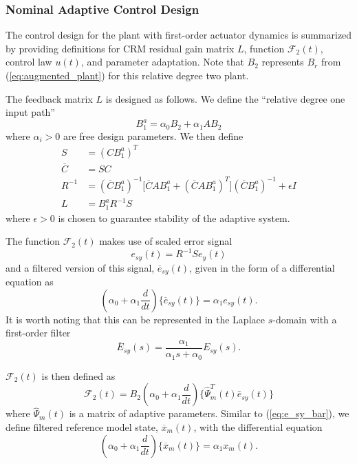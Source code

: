 \documentclass[english]{ifacconf}
\begin{document}
\subsubsection{Nominal Adaptive Control Design}
The control design for the plant with first-order actuator dynamics is summarized by providing definitions for CRM residual gain matrix $L$, function $\mathcal{F}_2(t)$, control law $u(t)$, and parameter adaptation. Note that $B_2$ represents $B_r$ from (\ref{eq:augmented_plant}) for this relative degree two plant. 

The feedback matrix $L$ is designed as follows. We define the ``relative degree one input path''
\begin{equation}
B_1^a = \alpha_0 B_2 + \alpha_1 A B_2 \label{eq:rd2-b1a}
\end{equation}
where $\alpha_i > 0$ are free design parameters. We then define
\begin{align}
S &= (C B_1^a)^T \label{eq:S}\\	\overline{C} & = S C\\ R^{-1} &= (\overline{C} B_1^a)^{-1} \big[ \overline{C} A B_1^a + (\overline{C} A B_1^a)^T\big] (\overline{C} B_1^a)^{-1} + \epsilon I \\ L & = B_1^a R^{-1} S \label{eq:L}
\end{align}
where $\epsilon > 0$ \cite[Eq. 30]{qu2015adaptive} is chosen to guarantee stability of the adaptive system. 

The function $\mathcal{F}_2(t)$ makes use of scaled error signal
\begin{equation}
	e_{sy}(t) = R^{-1} S e_y(t) \label{eq:esy}
\end{equation}
and a filtered version of this signal, $\overline{e}_{sy}(t)$, given in the form of a differential equation as
\begin{equation}
(\alpha_0 + \alpha_1 \frac{d}{dt}) \big\{ \overline{e}_{sy}(t) \big\} = \alpha_1 e_{sy}(t). \label{eq:e_sy_bar}
\end{equation}
It is worth noting that this can be represented in the Laplace $s$-domain with a first-order filter
\begin{equation*}
	\overline{E}_{sy}(s) = \frac{\alpha_1}{\alpha_1 s + \alpha_0} E_{sy}(s).
\end{equation*}

$\mathcal{F}_2(t)$ is then defined as
\begin{equation}
\mathcal{F}_2(t) = B_2 (\alpha_0 + \alpha_1 \frac{d}{dt})\big\{ \hat{\Psi}_m^T (t) \bar{e}_{sy}(t) \big\} \label{eq:F2}
\end{equation}
where $\hat{\Psi}_m(t)$ is a matrix of adaptive parameters. Similar to (\ref{eq:e_sy_bar}), we define filtered reference model state, $\overline{x}_m(t)$, with the differential equation
\begin{equation}
(\alpha_0 + \alpha_1 \frac{d}{dt}) \big\{ \overline{x}_{m}(t) \big\} = \alpha_1 x_{m}(t). \label{eq:xm_bar}
\end{equation}
\end{document}
